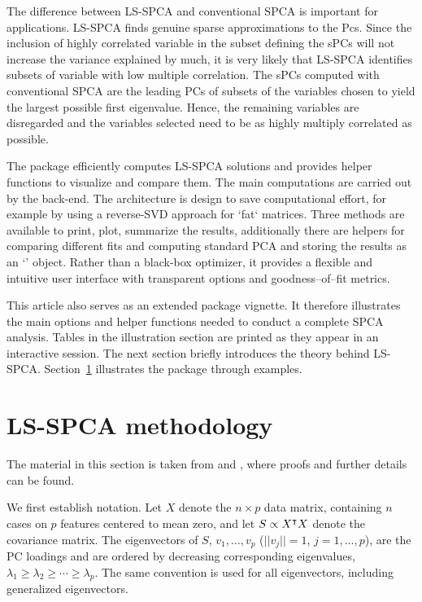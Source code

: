 \documentclass[article]{jss}
\newcommand{\class}[1]{`\code{#1}'}
\begin{document}
The difference between LS-SPCA and conventional SPCA is important for applications. LS-SPCA finds genuine sparse approximations to the Pcs. 
Since the inclusion of highly correlated variable in the subset defining the sPCs will not increase the variance explained by much, it is very likely that LS-SPCA identifies subsets of variable with low multiple correlation.
The sPCs computed with conventional SPCA are the leading PCs of subsets of the variables chosen to yield the largest possible first eigenvalue. Hence, the remaining variables are disregarded and the variables selected need to be as highly multiply correlated as possible. 

The  package efficiently computes LS-SPCA solutions and provides helper functions to visualize and compare them. 
The main computations are carried out by the  back-end. The architecture is design to save computational effort, for example by using a reverse-SVD approach for `fat` matrices. Three methods are available to print, plot, summarize the results, additionally there are helpers for comparing different fits and computing standard PCA and storing the results as an \class{spca} object. Rather than a black-box optimizer,  it provides a flexible and intuitive user interface with transparent options and goodness--of--fit metrics.

This article also serves as an extended package vignette. It therefore illustrates the main options and helper functions needed to conduct a complete SPCA analysis. Tables in the illustration section are printed as they appear in an interactive  session. The next section briefly introduces the theory behind LS-SPCA. Section~\ref{sec:spcapack} illustrates the package through examples.

\section{LS-SPCA methodology}\label{sec:spcapack}
The material in this section is taken from \citet{mer15} and \citet{mer19}, where proofs and further details can be found. 

We first establish notation. Let $X$ denote the $n \times p$ data matrix, containing $n$ cases on $p$ features centered to mean zero, and let $S \propto X^{\scriptstyle{\intercal}} X$ denote the covariance matrix. The eigenvectors of $S$, $v_1, \ldots, v_p$ ($\vert\vert v_j \vert\vert = 1$, $j = 1, \ldots, p$), are the PC loadings and are ordered by decreasing corresponding eigenvalues,
$\lambda_1 \geq \lambda_2 \geq \cdots \geq \lambda_p$. The same convention is used for all eigenvectors, including generalized eigenvectors.
\end{document}
